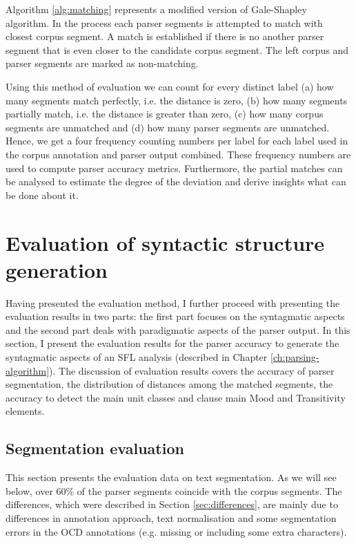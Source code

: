     Algorithm \ref{alg:matching} represents a modified version of Gale-Shapley algorithm. In the process each parser segments is attempted to match with closest corpus segment. A match is established if there is no another parser segment that is even closer to the candidate corpus segment. The left corpus and parser segments are marked as non-matching.

    Using this method of evaluation we can count for every distinct label (a) how many segments match perfectly, i.e. the distance is zero, (b) how many segments partially match, i.e. the distance is greater than zero, (c) how many corpus segments are unmatched and (d) how many parser segments are unmatched. Hence, we get a four frequency counting numbers per label for each label used in the corpus annotation and parser output combined. These frequency numbers are used to compute parser accuracy metrics. Furthermore, the partial matches can be analysed to estimate the degree of the deviation and derive insights what can be done about it.  

\section{Evaluation of syntactic structure generation}
\label{sec:syntactic-evaluation}
    
    Having presented the evaluation method, I further proceed with presenting the evaluation results in two parts: the first part focuses on the syntagmatic aspects and the second part deals with paradigmatic aspects of the parser output. In this section, I present the evaluation results for the parser accuracy to generate the syntagmatic aspects of an SFL analysis (described in Chapter \ref{ch:parsing-algorithm}). The discussion of evaluation results covers the accuracy of parser segmentation, the distribution of distances among the matched segments, the accuracy to detect the main unit classes and clause main Mood and Transitivity elements. 
    
\subsection{Segmentation evaluation}
\label{sec:segmentation-evaluation}
    
    This section presents the evaluation data on text segmentation. As we will see below, over 60\% of the parser segments coincide with the corpus segments. The differences, which were described in Section \ref{sec:differences}, are mainly due to differences in annotation approach, text normalisation and some segmentation errors in the OCD annotations (e.g. missing or including some extra characters). 
    
